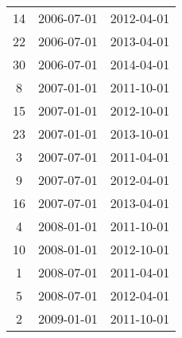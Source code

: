 \begin{tabular}{ccc}
  14 & 2006-07-01 & 2012-04-01 \\ 
  22 & 2006-07-01 & 2013-04-01 \\ 
  30 & 2006-07-01 & 2014-04-01 \\ 
  8 & 2007-01-01 & 2011-10-01 \\ 
  15 & 2007-01-01 & 2012-10-01 \\ 
  23 & 2007-01-01 & 2013-10-01 \\ 
  3 & 2007-07-01 & 2011-04-01 \\ 
  9 & 2007-07-01 & 2012-04-01 \\ 
  16 & 2007-07-01 & 2013-04-01 \\ 
  4 & 2008-01-01 & 2011-10-01 \\ 
  10 & 2008-01-01 & 2012-10-01 \\ 
  1 & 2008-07-01 & 2011-04-01 \\ 
  5 & 2008-07-01 & 2012-04-01 \\ 
  2 & 2009-01-01 & 2011-10-01 \\ 
   \hline
\end{tabular}
